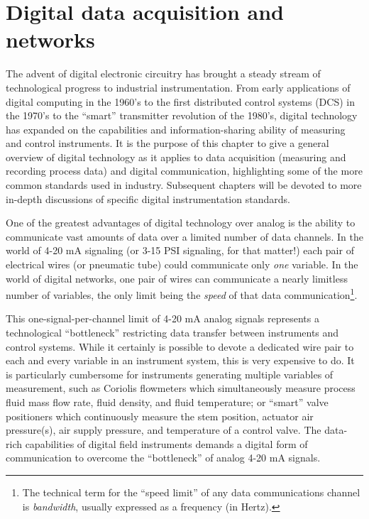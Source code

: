 
\chapter{Digital data acquisition and networks}

The advent of digital electronic circuitry has brought a steady stream of technological progress to industrial instrumentation.  From early applications of digital computing in the 1960's to the first distributed control systems (DCS) in the 1970's to the ``smart'' transmitter revolution of the 1980's, digital technology has expanded on the capabilities and information-sharing ability of measuring and control instruments.  It is the purpose of this chapter to give a general overview of digital technology as it applies to data acquisition (measuring and recording process data) and digital communication, highlighting some of the more common standards used in industry.  Subsequent chapters will be devoted to more in-depth discussions of specific digital instrumentation standards.

\vskip 10pt

One of the greatest advantages of digital technology over analog is the ability to communicate vast amounts of data over a limited number of data channels.  In the world of 4-20 mA signaling (or 3-15 PSI signaling, for that matter!) each pair of electrical wires (or pneumatic tube) could communicate only \textit{one} variable.  In the world of digital networks, one pair of wires can communicate a nearly limitless number of variables, the only limit being the \textit{speed} of that data communication\footnote{The technical term for the ``speed limit'' of any data communications channel is \textit{bandwidth}, usually expressed as a frequency (in Hertz).}.

This one-signal-per-channel limit of 4-20 mA analog signals represents a technological ``bottleneck'' restricting data transfer between instruments and control systems.  While it certainly is possible to devote a dedicated wire pair to each and every variable in an instrument system, this is very expensive to do.  It is particularly cumbersome for instruments generating multiple variables of measurement, such as Coriolis flowmeters which simultaneously measure process fluid mass flow rate, fluid density, and fluid temperature; or ``smart'' valve positioners which continuously measure the stem position, actuator air pressure(s), air supply pressure, and temperature of a control valve.  The data-rich capabilities of digital field instruments demands a digital form of communication to overcome the ``bottleneck'' of analog 4-20 mA signals.

